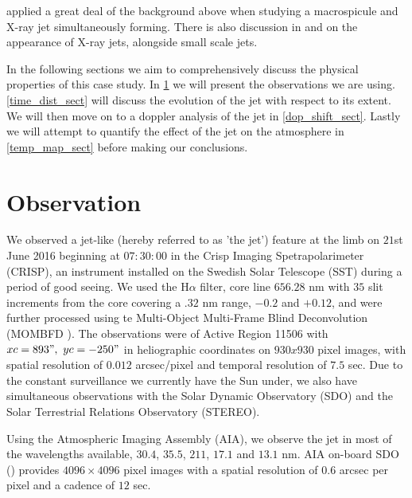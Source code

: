 \documentclass{emulateapj}
\begin{document}
\cite{Kamio2010} applied a great deal of the background above when studying a macrospicule and X-ray jet simultaneously forming. There is also discussion in \cite{Pike_Harrison1997} and \cite{Kim2007} on the appearance of X-ray jets, alongside small scale jets.

In the following sections we aim to comprehensively discuss the physical properties of this case study. In \ref{obs_sect} we will present the observations we are using. \ref{time_dist_sect} will discuss the evolution of the jet with respect to its extent. We will then move on to a doppler analysis of the jet in \ref{dop_shift_sect}. Lastly we will attempt to quantify the effect of the jet on the atmosphere in \ref{temp_map_sect} before making our conclusions.

 
 







\section{Observation}
\label{obs_sect}
We observed a jet-like (hereby referred to as 'the jet') feature at the limb on $21$st June 2016 beginning at $07:30:00$ in the Crisp Imaging Spetrapolarimeter (CRISP), an instrument installed on the Swedish Solar Telescope (SST) during a period of good seeing. %
We used the H$\alpha$ filter, core line $656.28$ nm with $35$ slit increments from the core covering a $.32$ nm range, $-0.2$ and $+0.12$, and were further processed using te Multi-Object Multi-Frame Blind Deconvolution (MOMBFD \cite{vanNoort2005}).
The observations were of Active Region 11506 with $xc = 893",\ yc = -250"$ in heliographic coordinates on $930x930$ pixel images, with spatial resolution of $0.012$ arcsec/pixel and temporal resolution of $7.5$ sec.
Due to the constant surveillance we currently have the Sun under, we also have simultaneous observations with the Solar Dynamic Observatory (SDO) and the Solar Terrestrial Relations Observatory (STEREO).

Using the Atmospheric Imaging Assembly (AIA), we observe the jet in most of the wavelengths available, $30.4$, $35.5$, $211$, $17.1$ and $13.1$ nm.
AIA on-board SDO (\cite{AIAspec}) provides $4096 \times 4096$ pixel images with a spatial resolution of $0.6$ arcsec per pixel and a cadence of $12$ sec.
\end{document}
